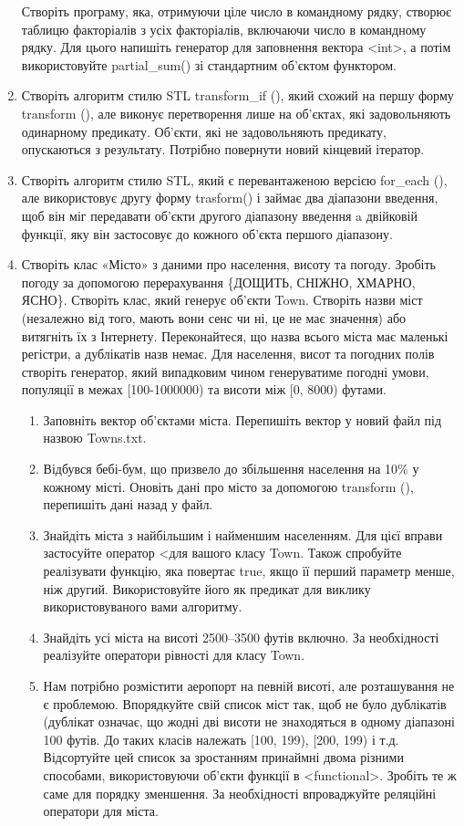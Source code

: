 \documentclass[a5paper,titlepage,openany,twoside,
]
{book_unv}%
\makeatletter
\newcommand{\xslalph}[1]{\expandafter\@xslalph\csname c@#1\endcsname}
\newcommand{\@xslalph}[1]{%
    \ifcase#1\or а\or б\or в\or г\or д\or e\or є\or ж\or з\or i%
    \or й\or к\or л\or м\or н\or о\or п\or р\or с\or т%
    \or у\or ф\or х\or ц\or ч\or ш\or ю\or я\or аа\or бб\or вв%
    \else\@ctrerr\fi%
}
\makeatother
\begin{document}
\begin{enumerate}
Створіть програму, яка, отримуючи ціле число в командному рядку,
  створює таблицю факторіалів з усіх факторіалів, включаючи число в
  командному рядку. Для цього напишіть генератор для заповнення вектора
  \textless{}int\textgreater{}, а потім використовуйте partial\_sum() 
зі стандартним об'єктом функтором.

\item
  Створіть алгоритм стилю STL transform\_if (), який схожий на першу форму
  transform (), але виконує перетворення лише на об'єктах, які
  задовольняють одинарному предикату. Об'єкти, які не задовольняють
  предикату, опускаються з результату. Потрібно повернути новий кінцевий
  ітератор.
\item
  Створіть алгоритм стилю STL, який є перевантаженою версією for\_each
  (), але використовує другу форму trasform() і займає два діапазони
  введення, щоб він міг передавати об'єкти другого діапазону введення a
  двійковій функції, яку він застосовує до кожного об'єкта першого
  діапазону.

\item
  Створіть клас «Місто» з даними про населення, висоту та погоду.
  Зробіть погоду за допомогою перерахування \{ДОЩИТЬ, СНІЖНО, ХМАРНО,
  ЯСНО\}. Створіть клас, який генерує об'єкти Town. Створіть назви міст
  (незалежно від того, мають вони сенс чи ні, це не має значення) або
  витягніть їх з Інтернету. Переконайтеся, що назва всього міста має
  маленькі регістри, а дублікатів назв немає. Для населення, висот та погодних
  полів створіть генератор, який випадковим чином генеруватиме погодні
  умови, популяції в межах {[}100-1000000) та висоти між {[}0, 8000)
  футами. 
\begin{enumerate}[label=\xslalph*)]
\item
Заповніть вектор об'єктами міста. Перепишіть вектор у новий
  файл під назвою Towns.txt. 
 
  \item
 Відбувся бебі-бум, що призвело до збільшення населення на 10\% у кожному
місті. Оновіть дані про місто за допомогою transform (), перепишіть дані
назад у файл. 
\item
Знайдіть міста з найбільшим і найменшим населенням. Для цієї вправи
  застосуйте оператор \textless{}для вашого класу Town. Також спробуйте
  реалізувати функцію, яка повертає true, якщо її перший параметр менше,
  ніж другий. Використовуйте його як предикат для виклику
  використовуваного вами алгоритму.
 \item
Знайдіть усі міста на висоті 2500--3500 футів включно. За необхідності
реалізуйте оператори рівності для класу Town.
 \item
  Нам потрібно розмістити аеропорт на певній висоті, але розташування не
  є проблемою. Впорядкуйте свій список міст так, щоб не було дублікатів
  (дублікат означає, що жодні дві висоти не знаходяться в одному
  діапазоні 100 футів. До таких класів належать {[}100, 199), {[}200,
  199) і т.д. Відсортуйте цей список за зростанням принаймні двома
  різними способами, використовуючи об'єкти функції в
  \textless{}functional\textgreater{}. Зробіть те ж саме для порядку
  зменшення. За необхідності впроваджуйте реляційні оператори для міста.
\end{enumerate}


\end{enumerate}
\end{document}
